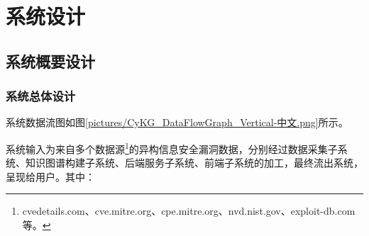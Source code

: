 \documentclass[a4paper,AutoFakeBold,oneside,12pt]{book}
\begin{document}
\chapter{系统设计}

\section{系统概要设计}

\subsection{系统总体设计}

系统数据流图如图\ref{pictures/CyKG_DataFlowGraph_Vertical-中文.png}所示。


系统输入为来自多个数据源\footnote{cvedetails.com、cve.mitre.org、cpe.mitre.org、nvd.nist.gov、exploit-db.com 等。}的异构信息安全漏洞数据，分别经过数据采集子系统、知识图谱构建子系统、后端服务子系统、前端子系统的加工，最终流出系统，呈现给用户。其中：
\end{document}
